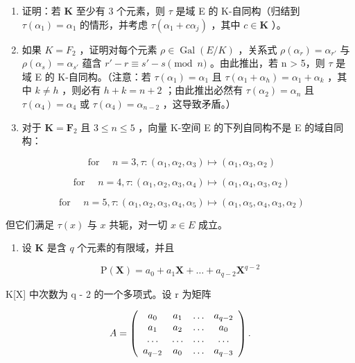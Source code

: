 \begin{enumerate}
\def\labelenumi{\alph{enumi})}
\item
  证明：若 \(\mathbf{K}\) 至少有 3 个元素，则 \(\tau\) 是域 E 的 K-自同构（归结到 \(\tau(\alpha_1) = \alpha_1\) 的情形，并考虑 \(\tau(\alpha_1 + c\alpha_j)\) ，其中 \(c \in \mathbf{K}\) ）。
\item
  如果 \(K = F_{2}\) ，证明对每个元素 \(\rho \in \operatorname{Gal}(E/K)\) ，关系式 \(\rho(\alpha_{r}) = \alpha_{r'}\) 与 \(\rho(\alpha_{s}) = \alpha_{s'}\) 蕴含 \(r' - r \equiv s' - s \pmod{n}\) 。由此推出，若 n \textgreater{} 5，则 \(\tau\) 是域 E 的 K-自同构。（注意：若 \(\tau(\alpha_{1}) = \alpha_{1}\) 且 \(\tau(\alpha_{1} + \alpha_{h}) = \alpha_{1} + \alpha_{k}\) ，其中 \(k \neq h\) ，则必有 \(h + k = n + 2\) ；由此推出必然有 \(\tau(\alpha_{2}) = \alpha_{n}\) 且 \(\tau(\alpha_{4}) = \alpha_{4}\) 或 \(\tau(\alpha_{4}) = \alpha_{n-2}\) ，这导致矛盾。）
\item
  对于 \(\mathbf{K} = \mathbf{F}_2\) 且 \(3 \leqslant n \leqslant 5\) ，向量 K-空间 E 的下列自同构不是 E 的域自同构：
\end{enumerate}

\[
\text { for } \quad n = 3, \tau : (\alpha_ {1}, \alpha_ {2}, \alpha_ {3}) \mapsto (\alpha_ {1}, \alpha_ {3}, \alpha_ {2})
\]

\[
\text { for } \quad n = 4, \tau : (\alpha_ {1}, \alpha_ {2}, \alpha_ {3}, \alpha_ {4}) \mapsto (\alpha_ {1}, \alpha_ {4}, \alpha_ {3}, \alpha_ {2})
\]

\[
\text { for } \quad n = 5, \tau : (\alpha_ {1}, \alpha_ {2}, \alpha_ {3}, \alpha_ {4}, \alpha_ {5}) \mapsto (\alpha_ {1}, \alpha_ {5}, \alpha_ {4}, \alpha_ {3}, \alpha_ {2})
\]

但它们满足 \(\tau(x)\) 与 \(x\) 共轭，对一切 \(x \in E\) 成立。

\begin{enumerate}
\def\labelenumi{\arabic{enumi})}
\setcounter{enumi}{7}
\tightlist
\item
  设 \(\mathbf{K}\) 是含 \(q\) 个元素的有限域，并且
\end{enumerate}

\[
\mathrm{P} (\mathbf {X}) = a _ {0} + a _ {1} \mathbf {X} + \dots + a _ {q - 2} \mathbf {X} ^ {q - 2}
\]

K{[}X{]} 中次数为 q - 2 的一个多项式。设 r 为矩阵

\[
A = \left( \begin{array}{c c c c} a _ {0} & a _ {1} & \dots & a _ {q - 2} \\ a _ {1} & a _ {2} & \dots & a _ {0} \\ \dots & \dots & \dots & \dots \\ a _ {q - 2} & a _ {0} & \dots & a _ {q - 3} \end{array} \right).
\]

